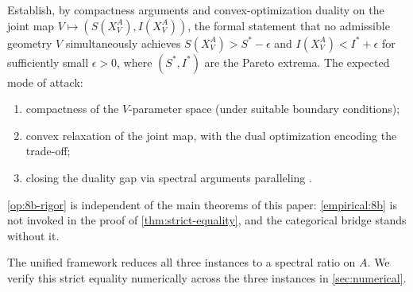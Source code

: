 \begin{openproblem}\label{op:8b-rigor}
Establish, by compactness arguments and convex-optimization duality on
the joint map $V \mapsto (S(X^A_V), I(X^A_V))$, the formal statement
that no admissible geometry $V$ simultaneously achieves
$S(X^A_V) > S^* - \epsilon$ and $I(X^A_V) < I^* + \epsilon$ for
sufficiently small $\epsilon > 0$, where $(S^*, I^*)$ are the Pareto
extrema. The expected mode of attack:
\begin{enumerate}[leftmargin=*]
\item compactness of the $V$-parameter space (under suitable boundary
  conditions);
\item convex relaxation of the joint map, with the dual optimization
  encoding the trade-off;
\item closing the duality gap via spectral arguments paralleling
  \cite{Pilleboue2015}.
\end{enumerate}
\cref{op:8b-rigor} is independent of the main theorems of this paper:
\cref{empirical:8b} is not invoked in the proof of
\cref{thm:strict-equality}, and the categorical bridge stands without
it.
\end{openproblem}

\noindent
The unified framework reduces all three instances to a spectral ratio
on $A$. We verify this strict equality numerically across the three
instances in \cref{sec:numerical}.
